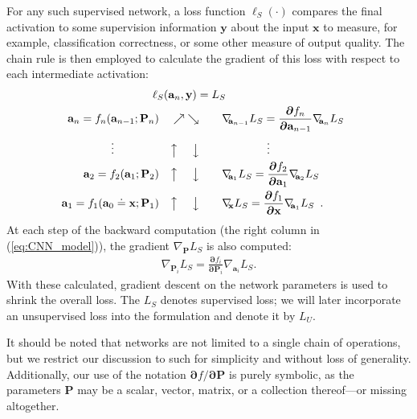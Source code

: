 \documentclass[10pt,twocolumn,letterpaper]{article}
\renewcommand{\vec}{\mathbf}
\newcommand{\Pdv}[2]{\ensuremath{\frac{\boldsymbol{\partial} #1}{\boldsymbol{\partial} #2}}}
\newcommand{\grad}[2]{\nabla_{\!\! #1} #2}
\newcommand{\loss}{\ensuremath{\ell}}
\newcommand{\x}{\vec{x}}
\newcommand{\y}{\vec{y}}
\renewcommand{\P}{\vec{P}}
\renewcommand{\a}{\vec{a}}
\begin{document}
For any such supervised network, a loss function $\loss_S(\cdot)$ compares the final activation to some supervision information $\y$ about the input $\x$ to measure, for example, classification correctness, or some other measure of output quality. The chain rule is then employed to calculate the gradient of this loss with respect to each intermediate activation: 
%
\begin{alignat}{3}
\rlap{$\hspace{-0.2cm}\loss_S(\a_n,\y) = L_S$} 
\label{eq:CNN_model}\\
%
\a_n = f_n(\a_{n-1};\P_n) &\quad\nearrow\;\searrow\;&& \grad{\a_{n-1}}{L_S} = \Pdv{f_n}{\a_{n-1}}\grad{\a_n}{L_S}  \nonumber \\
%
\vdots \quad\quad\quad\quad &\quad\big\uparrow\quad\;\big\downarrow\quad&& \quad\quad\quad\quad \vdots \nonumber \\
%
\a_2 = f_2(\a_1;\P_2) &\quad\big\uparrow\quad\;\big\downarrow\quad&& \grad{\a_1}{L_S} = \Pdv{f_2}{\a_1}\grad{\a_2}{L_S} \nonumber \\
%
\a_1 = f_1(\a_0\doteq\x;\P_1) &\quad\big\uparrow\quad\;\big\downarrow\quad&& \grad{\x}{L_S} = \Pdv{f_1}{\x}\grad{\a_1}{L_S}
\enspace.
    \nonumber 
\end{alignat}
%
\noindent At each step of the backward computation (the right column in (\ref{eq:CNN_model})), the gradient $\grad{\P}{L_S}$ is also computed:
%
\begin{align}
\grad{\P_i}{L_S} = \Pdv{f_i}{\P_i}\grad{\a_i}{L_S}.
\label{eq:CNN_Pgrad}
\end{align}
With these calculated, gradient descent on the network parameters is used to shrink the overall loss.  
The $L_S$ denotes supervised loss;
we will later incorporate an unsupervised loss into the formulation and denote it by $L_U$.

It should be noted that networks are not limited to a single chain of operations, but we restrict our discussion to such for simplicity and without loss of generality. Additionally, our use of the notation $\boldsymbol{\partial}f/\boldsymbol{\partial}\P$ is purely symbolic, as the parameters $\P$ may be a scalar, vector, matrix, or a collection thereof---or missing altogether.   

\end{document}
